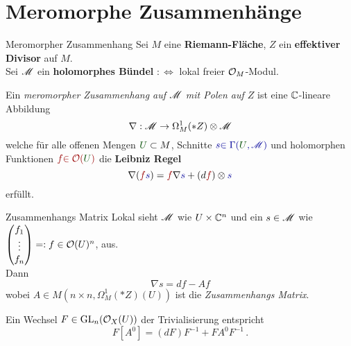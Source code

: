 \section{Meromorphe Zusammenhänge}
\begin{frame}[t]{Meromorpher Zusammenhang}
  Sei $M$ eine \textbf{Riemann-Fläche}, $Z$ ein \textbf{effektiver Divisor} auf
  $M$.
  \\Sei $\mathscr{M}$ ein \textbf{holomorphes Bündel}
  $:\Leftrightarrow{}$ lokal freier $\mathcal{O}_M$-Modul.
  \begin{defn}
    \def\myU{\textcolor{green!30!black}{U}}
    \def\mys{\textcolor{blue!60!black}{s}}
    \def\myf{\textcolor{red!60!black}{f}}
    Ein \emph{meromorpher Zusammenhang auf $\mathscr{M}$ mit Polen auf $Z$}
    ist eine $\mathbb{C}$-lineare Abbildung
    \[
      \nabla:\mathscr{M}\to\Omega_M^1(*Z)\otimes\mathscr{M}
    \]
    welche für alle offenen Mengen $\myU\subset M$, Schnitte
    $\mys\textcolor{blue!60!black}{\in\Gamma(\myU,\sM)}$ und holomorphen
    Funktionen $\myf\textcolor{red!60!black}{\in\cO(\myU)}$ die \textbf{Leibniz
    Regel}
    \[
      \nabla(\myf\mys)=\myf\nabla\mys+(d\myf)\otimes\mys
    \]
    erfüllt.
  \end{defn}
\end{frame}
\begin{frame}[t]{Zusammenhangs Matrix}
  Lokal sieht $\mathscr{M}$ wie $U\times\mathbb{C}^n$ und ein $s\in\mathscr{M}$ wie
  $\begin{pmatrix}f_{1}\\\vdots\\f_{n}\end{pmatrix}=:f\in\mathcal{O}(U)^n$, aus.
  \\Dann
  \[
    \nabla s=df-Af
  \]
  wobei $A\in M(n\times n,\Omega_M^1(*Z)(U))$ ist die \emph{Zusammenhangs
  Matrix}.

  Ein Wechsel $F\in\operatorname{GL}_n(\mathcal{O}_X(U))$ der Trivialisierung entspricht
  \[
    F[A^0]=(dF)F^{-1}+FA^0F^{-1} \,.
  \]
\end{frame}

